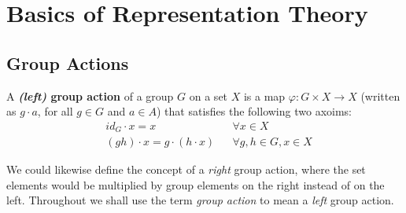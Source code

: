 
\chapter{Basics of Representation Theory} %




\section {Group Actions}

\begin{defn}\label{def-grp-action}
A  \textbf{\textit{(left)} group action} of a group $G$ on a set $X$ is a map $\varphi : G \times X \to X$ (written as $g \cdot a$, for all $g \in G$ and $a \in A$) that satisfies the following two axoims:
\begin{align}
\label{grp-action-axiom-1}&id_G \cdot  x = x && \forall x \in X\\
\label{grp-action-axiom-2}&(gh) \cdot x  = g \cdot (h \cdot x) && \forall g,h \in G, x \in X
\end{align}
\end{defn}
\begin{note}
We could likewise define the concept of a \textit{right} group action, where the set elements would be multiplied by group elements on the right instead of on the left.  Throughout we shall use the term \textit{group action} to mean a \textit{left} group action.
\end{note}

